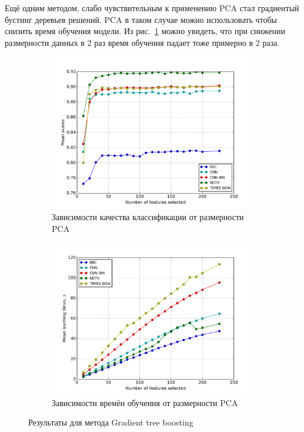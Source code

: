 \par
Ещё одним методом, слабо чувствительным к применению PCA стал градиентый бустинг деревьев решений. PCA в таком случае можно использовать чтобы снизить время обучения модели. Из рис.~\ref{fig:gtb_pca} можно увидеть, что при снижении размерности данных в 2 раз время обучения падает тоже примерно в 2 раза.

\begin{figure}[h!]
    \centering
	\begin{subfigure}{0.45\textwidth}
		\includegraphics[width=\textwidth]{images/PCA-GTB.png}
		\caption{Зависимости качества классификации от размерности PCA}
	\end{subfigure}
	\begin{subfigure}{0.45\textwidth}
		\includegraphics[width=\textwidth]{images/PCA-GTBTime.png}
		\caption{Зависимости времён обучения от размерности PCA}
	\end{subfigure}
	\caption{Результаты для метода Gradient tree boosting}\label{fig:gtb_pca}
\end{figure}

